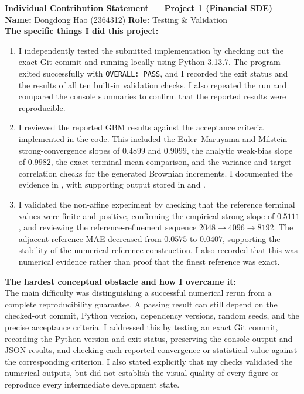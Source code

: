 \documentclass[11pt,a4paper]{article}
\theoremstyle{definition}
\theoremstyle{remark}
\begin{document}
\newpage

\begin{formbox}
\textbf{Individual Contribution Statement --- Project 1 (Financial SDE)}\\[0.4em]

\textbf{Name:} Dongdong Hao (2364312)
\hfill
\textbf{Role:} Testing \& Validation\\[0.4em]

\textbf{The specific things I did this project:}
\begin{enumerate}[leftmargin=2em]

\item I independently tested the submitted implementation by checking out the exact Git commit
and running  locally using Python 3.13.7.
The program exited successfully with \texttt{OVERALL: PASS}, and I recorded the exit status and the results of all ten built-in validation checks. I also repeated the run and compared the console summaries to confirm that the reported results were reproducible.

\item I reviewed the reported GBM results against the acceptance criteria implemented in the code. This included the Euler--Maruyama and Milstein strong-convergence slopes of \(0.4899\) and \(0.9099\), the analytic weak-bias slope of \(0.9982\), the exact terminal-mean comparison, and the variance and target-correlation checks for the generated Brownian increments. I documented the evidence in , with supporting output stored in  and .

\item I validated the non-affine experiment by checking that the reference terminal values were finite and positive, confirming the empirical strong slope of \(0.5111\), and reviewing the reference-refinement sequence \(2048 \rightarrow 4096 \rightarrow 8192\). The adjacent-reference MAE decreased from \(0.0575\) to \(0.0407\), supporting the stability of the numerical-reference construction. I also recorded that this was numerical evidence rather than proof that the finest reference was exact.

\end{enumerate}

\textbf{The hardest conceptual obstacle and how I overcame it:}\\
The main difficulty was distinguishing a successful numerical rerun from a complete reproducibility guarantee. A passing result can still depend on the checked-out commit, Python version, dependency versions, random seeds, and the precise acceptance criteria. I addressed this by testing an exact Git commit, recording the Python version and exit status, preserving the console output and JSON results, and checking each reported convergence or statistical value against the corresponding criterion. I also stated explicitly that my checks validated the numerical outputs, but did not establish the visual quality of every figure or reproduce every intermediate development state.\\[0.4em]


\end{formbox}
\end{document}
